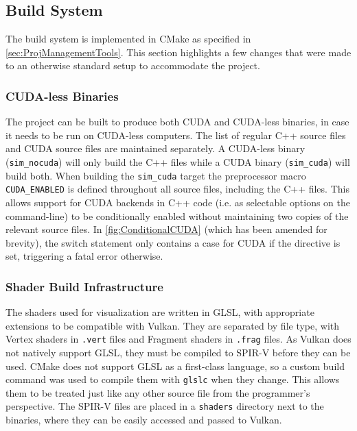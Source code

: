 \subsection{Build System}
The build system is implemented in CMake\cite{tool:Cmake} as specified in \cref{sec:ProjManagementTools}.
This section highlights a few changes that were made to an otherwise standard setup to accommodate the project.

\subsubsection{CUDA-less Binaries}
The project can be built to produce both CUDA and CUDA-less binaries, in case it needs to be run on CUDA-less computers.
The list of regular C++ source files and CUDA source files are maintained separately. A CUDA-less binary (\texttt{sim\_nocuda}) will only build the C++ files while a CUDA binary (\texttt{sim\_cuda}) will build both.
When building the \texttt{sim\_cuda} target the preprocessor macro \texttt{CUDA\_ENABLED} is defined throughout all source files, including the C++ files.
This allows support for CUDA backends in C++ code (i.e. as selectable options on the command-line) to be conditionally enabled without maintaining two copies of the relevant source files.
In \cref{fig:ConditionalCUDA} (which has been amended for brevity), the switch statement only contains a case for CUDA if the directive is set, triggering a fatal error otherwise.



\subsubsection{Shader Build Infrastructure} %
The shaders used for visualization are written in GLSL, with appropriate extensions to be compatible with Vulkan.
They are separated by file type, with Vertex shaders in \texttt{.vert} files and Fragment shaders in \texttt{.frag} files.
As Vulkan does not natively support GLSL, they must be compiled to SPIR-V before they can be used.
CMake does not support GLSL as a first-class language, so a custom build command was used to compile them with \texttt{glslc}\cite{GoogleLLCShaderc} when they change.
This allows them to be treated just like any other source file from the programmer's perspective.
The SPIR-V files are placed in a \texttt{shaders} directory next to the binaries, where they can be easily accessed and passed to Vulkan.
